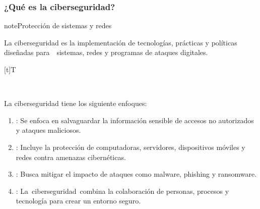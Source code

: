 \documentclass[letterpaper,10pt,spanish]{sphinxmanual}
\let\sphinxpxdimen\pdfpxdimen\else\newdimen\sphinxpxdimen
\begin{document}
\subsubsection{¿Qué es la ciberseguridad?}
\label{\detokenize{1_guias/10informatica/G1003:que-es-la-ciberseguridad}}
\begin{sphinxadmonition}{note}{Protección de sistemas y redes}

\sphinxAtStartPar
La ciberseguridad es la implementación de tecnologías, prácticas y políticas diseñadas para  sistemas, redes y programas de ataques digitales.


\begin{savenotes}\sphinxattablestart
\sphinxthistablewithglobalstyle
\centering
\begin{tabulary}{\linewidth}[t]{T}
\sphinxtoprule
\sphinxtableatstartofbodyhook

\begin{sphinxfigure-in-table}
\centering
\capstart
\noindent\sphinxincludegraphics[width=300\sphinxpxdimen]{{image11}.png}
\label{\detokenize{1_guias/10informatica/G1003:id12}}\end{sphinxfigure-in-table}\relax
\\
\sphinxbottomrule
\end{tabulary}
\sphinxtableafterendhook\par
\sphinxattableend\end{savenotes}

\sphinxAtStartPar
La ciberseguridad tiene los siguiente enfoques:
\begin{enumerate}
%
\item {} 
\sphinxAtStartPar
{}: Se enfoca en salvaguardar la información sensible de accesos no autorizados y ataques maliciosos.

\item {} 
\sphinxAtStartPar
{}: Incluye la protección de computadoras, servidores, dispositivos móviles y redes contra amenazas cibernéticas.

\item {} 
\sphinxAtStartPar
{}: Busca mitigar el impacto de ataques como malware, phishing y ransomware.

\item {} 
\sphinxAtStartPar
{}: La ciberseguridad combina la colaboración de personas, procesos y tecnología para crear un entorno seguro.


\end{enumerate}
\end{sphinxadmonition}
\end{document}
